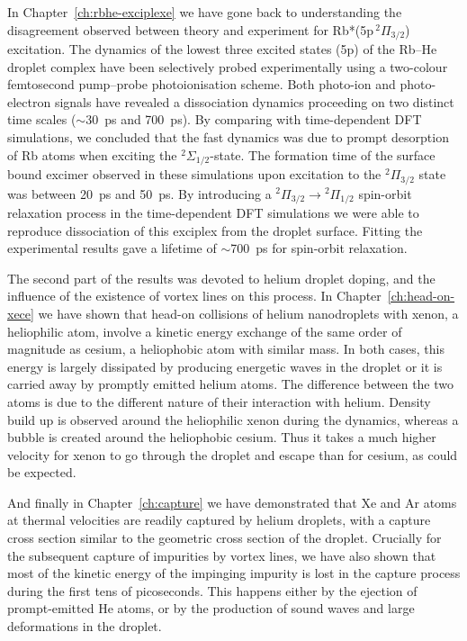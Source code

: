 	In Chapter~\ref{ch:rbhe-exciplexe} we have gone back to understanding the disagreement observed between theory and experiment for Rb*(5p$\,^2\Pi_{3/2}$) excitation. The dynamics of the lowest three excited states (5p) of the Rb–He droplet complex have been selectively probed experimentally using a two-colour femtosecond pump–probe photoionisation scheme. Both photo-ion and photo-electron signals have revealed a dissociation dynamics proceeding on two distinct time scales ($\sim$30~ps and 700~ps). By comparing with time-dependent DFT simulations, we concluded that the fast dynamics was due to prompt desorption of Rb atoms when exciting the $^2\Sigma_{1/2}$-state. The formation time of the surface bound excimer observed in these simulations upon excitation to the $^2\Pi_{3/2}$ state was between 20~ps and 50~ps. By introducing a $^2\Pi_{3/2}\!\!\longrightarrow\!\!^2\Pi_{1/2}$ spin-orbit relaxation process in the time-dependent DFT simulations we were able to reproduce dissociation of this exciplex from the droplet surface. Fitting the experimental results gave a lifetime of $\sim$700~ps for spin-orbit relaxation.

	The second part of the results was devoted to helium droplet doping, and the influence of the existence of vortex lines on this process. In Chapter~\ref{ch:head-on-xece} we have shown that head-on collisions of helium nanodroplets with xenon, a heliophilic atom, involve a kinetic energy exchange of the same order of magnitude as cesium, a heliophobic atom with similar mass. In both cases, this energy is largely dissipated by producing energetic waves in the droplet or it is carried away by promptly emitted helium atoms. The difference between the two atoms is due to the different nature of their interaction with helium. Density build up is observed around the heliophilic xenon during the dynamics, whereas a bubble is created around the heliophobic cesium. Thus it takes a much higher velocity for xenon to go through the droplet and escape than for cesium, as could be expected.

	And finally in Chapter~\ref{ch:capture} we have demonstrated that Xe and Ar atoms at thermal velocities are readily captured by helium droplets, with a capture cross section similar to the geometric cross section of the droplet. Crucially for the subsequent capture of impurities by vortex lines, we have also shown that most of the kinetic energy of the impinging impurity is lost in the capture process during the first tens of picoseconds. This happens either by the ejection of prompt-emitted He atoms, or by the production of sound waves and large deformations in the droplet. 


